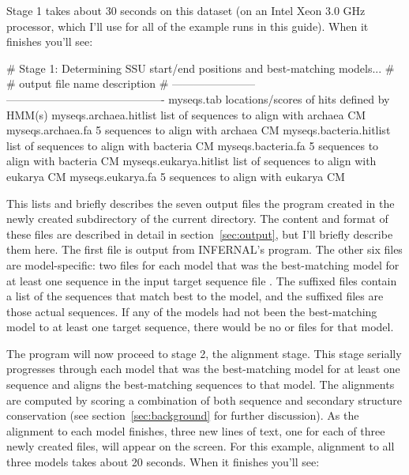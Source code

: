 Stage 1 takes about 30 seconds on this dataset (on an Intel Xeon 3.0
GHz processor, which I'll use for all of the example runs in this
guide). When it finishes you'll see: 

\begin{sreoutput}
# Stage 1: Determining SSU start/end positions and best-matching models...
#
# output file name         description                                
# -----------------------  -------------------------------------------
  myseqs.tab               locations/scores of hits defined by HMM(s)
  myseqs.archaea.hitlist   list of sequences to align with archaea CM
  myseqs.archaea.fa              5 sequences to align with archaea CM
  myseqs.bacteria.hitlist  list of sequences to align with bacteria CM
  myseqs.bacteria.fa             5 sequences to align with bacteria CM
  myseqs.eukarya.hitlist   list of sequences to align with eukarya CM
  myseqs.eukarya.fa              5 sequences to align with eukarya CM
\end{sreoutput}

This lists and briefly describes the seven output files the program created
in the newly created  subdirectory of the current directory.
The content and format of these files are described
in detail in section~\ref{sec:output}, but I'll briefly describe them 
here. The first file  is output from
INFERNAL's  program. The other six files are
model-specific: two files for each model that was the best-matching
model for at least one sequence in the input target sequence file
. The  suffixed files contain a list
of the sequences that match best to the model, and the 
suffixed files are those actual sequences. If any of the models had
not been the best-matching model to at least one target sequence,
there would be no  or  files for that
model.

The program will now proceed to stage 2, the alignment stage. This
stage serially progresses through each model that was the
best-matching model for at least one sequence and aligns the
best-matching sequences to that model. The alignments are computed by
scoring a combination of both sequence and secondary structure
conservation (see section~\ref{sec:background} for further
discussion). 
As the alignment to each model finishes, three new lines
of text, one for each of three newly created files, will appear on the
screen. For this example, alignment to all three models takes about 20
seconds. When it finishes you'll see:

